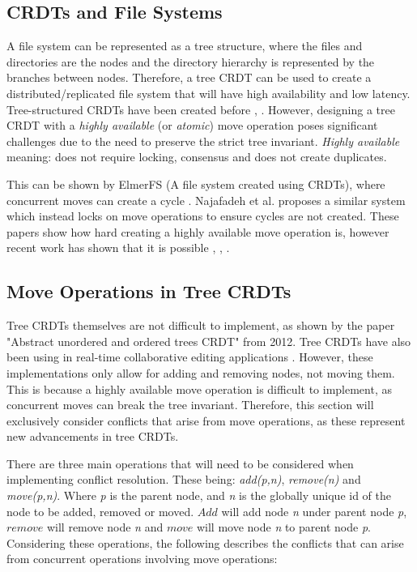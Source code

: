 \documentclass[12pt]{report}
\begin{document}
\subsection{CRDTs and File Systems}
A file system can be represented as a tree structure, where the files and directories are the nodes and the directory hierarchy is represented by the branches between nodes. Therefore, a tree CRDT can be used to create a distributed/replicated file system that will have high availability and low latency. Tree-structured CRDTs have been created before \cite{10.1145/2757667.2757683}, \cite{kleppmann2018automerge}. However, designing a tree CRDT with a \textit{highly available} (or \textit{atomic}) move operation poses significant challenges due to the need to preserve the strict tree invariant. \textit{Highly available} meaning: does not require locking, consensus and does not create duplicates.   \par

This can be shown by ElmerFS (A file system created using CRDTs), where concurrent moves can create a cycle \cite{10.1145/3465332.3470872}. Najafadeh et al. \cite{Najafzadeh0E18} proposes a similar system which instead locks on move operations to ensure cycles are not created. These papers show how hard creating a highly available move operation is, however recent work has shown that it is possible \cite{9563274}, \cite{https://doi.org/10.48550/arxiv.2103.04828}, \cite{https://doi.org/10.48550/arxiv.1805.04263}. \par

\subsection{Move Operations in Tree CRDTs}
Tree CRDTs themselves are not difficult to implement, as shown by the paper "Abstract unordered and ordered trees CRDT" \cite{martin2012abstract} from 2012. Tree CRDTs have also been using in real-time collaborative editing applications \cite{5158449}. However, these implementations only allow for adding and removing nodes, not moving them. This is because a highly available move operation is difficult to implement, as concurrent moves can break the tree invariant. Therefore, this section will exclusively consider conflicts that arise from move operations, as these represent new advancements in tree CRDTs. 

There are three main operations that will need to be considered when implementing conflict resolution. These being: \textit{add(p,n)}, \textit{remove(n)} and \textit{move(p,n)}. Where \textit{p} is the parent node, and \textit{n} is the globally unique id of the node to be added, removed or moved. $Add$ will add node \textit{n} under parent node \textit{p}, $remove$ will remove node \textit{n} and $move$ will move node \textit{n} to parent node \textit{p}. Considering these operations, the following describes the conflicts that can arise from concurrent operations involving move operations:
\end{document}

